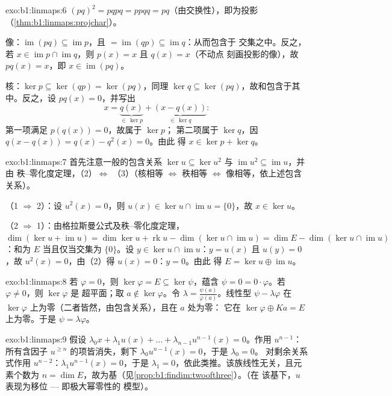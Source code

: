 \begin{solution}{exo:b1:linmaps:6}
$(pq)^2 = pqpq = ppqq = pq$（由交换性），即为投影
（\cref{thm:b1:linmaps:projchar}）。

像：$\operatorname{im}(pq) \subseteq \operatorname{im} p$，且
$= \operatorname{im}(qp) \subseteq \operatorname{im} q$：从而包含于
交集之中。反之，若 $x \in \operatorname{im} p \cap
\operatorname{im} q$，则 $p(x) = x$ 且 $q(x) = x$（不动点
刻画投影的像），故 $pq(x) = x$，即 $x \in
\operatorname{im}(pq)$。

核：$\ker p \subseteq \ker(qp) = \ker(pq)$，同理 $\ker q
\subseteq \ker(pq)$，故和包含于其中。反之，设 $pq(x) =
0$，并写出
\[
x = \underbrace{q(x)}_{\in\, \ker p} +
\underbrace{(x - q(x))}_{\in\, \ker q} :
\]
第一项满足 $p(q(x)) = 0$，故属于 $\ker p$；
第二项属于 $\ker q$，因 $q(x - q(x)) = q(x) - q^2(x) = 0$。由此
得 $x \in \ker p + \ker q$。
\end{solution}

\begin{solution}{exo:b1:linmaps:7}
首先注意一般的包含关系 $\ker u \subseteq \ker u^2$ 与
$\operatorname{im} u^2 \subseteq \operatorname{im} u$，并由
秩–零化度定理，（2）$\iff$ （3）（核相等 $\iff$ 秩相等
$\iff$ 像相等，依上述包含关系）。

（1 $\Rightarrow$ 2）：设 $u^2(x) = 0$，则 $u(x) \in \ker u \cap
\operatorname{im} u = \{0\}$，故 $x \in \ker u$。

（2 $\Rightarrow$ 1）：由格拉斯曼公式及秩–零化度定理，$\dim(\ker u +
\operatorname{im} u) = \dim\ker u + \operatorname{rk} u -
\dim(\ker u \cap \operatorname{im} u) = \dim E - \dim(\ker u \cap
\operatorname{im} u)$：和为 $E$ 当且仅当交集为
$\{0\}$。设 $y \in \ker u \cap \operatorname{im} u$：$y = u(x)$ 且
$u(y) = 0$，故 $u^2(x) = 0$，由（2）得 $u(x) = 0$：$y = 0$。由此
得 $E = \ker u \oplus \operatorname{im} u$。
\end{solution}

\begin{solution}{exo:b1:linmaps:8}
若 $\varphi = 0$，则 $\ker\varphi = E \subseteq \ker\psi$，蕴含
$\psi = 0 = 0\cdot\varphi$。若 $\varphi \neq 0$，则 $\ker\varphi$ 是
超平面；取 $a \notin \ker\varphi$。令 $\lambda =
\frac{\psi(a)}{\varphi(a)}$。线性型 $\psi - \lambda\varphi$
在 $\ker\varphi$ 上为零（二者皆然，由包含关系），且在 $a$ 处为零：
它在 $\ker\varphi \oplus Ka = E$ 上为零。于是 $\psi =
\lambda\varphi$。
\end{solution}

\begin{solution}{exo:b1:linmaps:9}
假设 $\lambda_0 x + \lambda_1 u(x) + \dots + \lambda_{n-1}
u^{n-1}(x) = 0$。作用 $u^{n-1}$：所有含因子 $u^{\geq
n}$ 的项皆消失，剩下 $\lambda_0 u^{n-1}(x) = 0$，于是 $\lambda_0 = 0$。
对剩余关系式作用 $u^{n-2}$：$\lambda_1 u^{n-1}(x) =
0$，于是 $\lambda_1 = 0$，依此类推。该族线性无关，且元素个数为
$n = \dim E$，故为基（见\cref{prop:b1:findim:twoofthree}）。（在
该基下，$u$ 表现为移位 --- 即极大幂零性的
模型）。
\end{solution}

